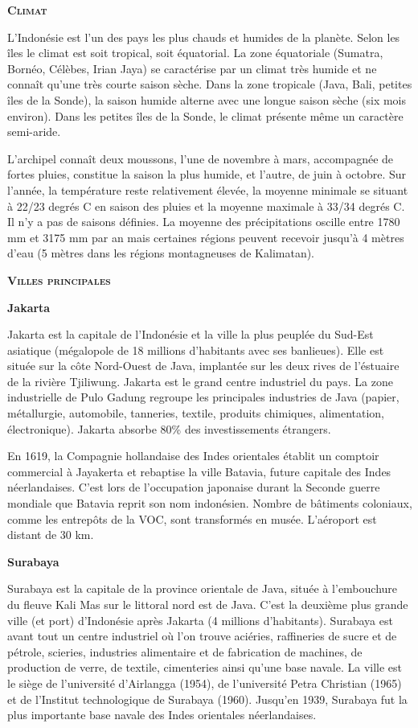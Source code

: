 \textbf{\textsc{Climat}}

L'Indonésie est l'un des pays les plus chauds et humides de la planète. Selon les îles le climat est soit tropical, soit équatorial. La zone équatoriale (Sumatra, Bornéo, Célèbes, Irian Jaya) se caractérise par un climat très humide et ne connaît qu'une très courte saison sèche. Dans la zone tropicale (Java, Bali, petites îles de la Sonde), la saison humide alterne avec une longue saison sèche (six mois environ). Dans les petites îles de la Sonde, le climat présente même un caractère semi-aride.

L'archipel connaît deux moussons, l'une de novembre à mars, accompagnée de fortes pluies, constitue la saison la plus humide, et l'autre, de juin à octobre. Sur l'année, la température reste relativement élevée, la moyenne minimale se situant à 22/23 degrés C en saison des pluies et la moyenne maximale à 33/34 degrés C. Il n'y a pas de saisons définies. La moyenne des précipitations oscille entre 1780 mm et 3175 mm par an mais certaines régions peuvent recevoir jusqu'à 4 mètres d'eau (5 mètres dans les régions montagneuses de Kalimatan).

\textbf{\textsc{Villes principales}}

\textbf{Jakarta}

Jakarta est la capitale de l'Indonésie et la ville la plus peuplée du Sud-Est asiatique (mégalopole de 18 millions d'habitants avec ses banlieues). Elle est située sur la côte Nord-Ouest de Java, implantée sur les deux rives de l'éstuaire de la rivière Tjiliwung. Jakarta est le grand centre industriel du pays. La zone industrielle de Pulo Gadung regroupe les principales industries de Java (papier, métallurgie, automobile, tanneries, textile, produits chimiques, alimentation, électronique). Jakarta absorbe 80\% des investissements étrangers.

En 1619, la Compagnie hollandaise des Indes orientales établit un comptoir commercial à Jayakerta et rebaptise la ville Batavia, future capitale des Indes néerlandaises. C'est lors de l'occupation japonaise durant la Seconde guerre mondiale que Batavia reprit son nom indonésien. Nombre de bâtiments coloniaux, comme les entrepôts de la VOC, sont transformés en musée. L'aéroport est distant de 30 km.

\textbf{Surabaya}

Surabaya est la capitale de la province orientale de Java, située à l'embouchure du fleuve Kali Mas sur le littoral nord est de Java. C'est la deuxième plus grande ville (et port) d'Indonésie après Jakarta (4 millions d'habitants). Surabaya est avant tout un centre industriel où l'on trouve aciéries, raffineries de sucre et de pétrole, scieries, industries alimentaire et de fabrication de machines, de production de verre, de textile, cimenteries ainsi qu'une base navale. La ville est le siège de l'université d'Airlangga (1954), de l'université Petra Christian (1965) et de l'Institut technologique de Surabaya (1960). Jusqu'en 1939, Surabaya fut la plus importante base navale des Indes orientales néerlandaises.

